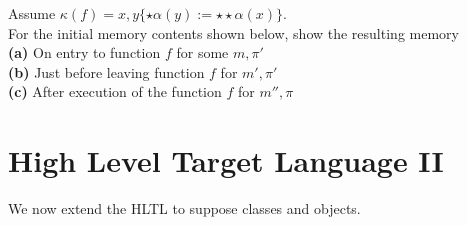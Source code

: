 \frmrule

\begin{example}
Assume $\kappa(f) = x,y \{ \star \alpha(y) := \star \star \alpha(x) \}$. \\
For the initial memory contents shown below, show the resulting memory \\
\textbf{(a)} On entry to function $f$ for some $m, \pi'$ \\
\textbf{(b)} Just before leaving function $f$ for $m', \pi'$ \\
\textbf{(c)} After execution of the function $f$ for $m'', \pi$ \\

\end{example}

\frmrule



\section{High Level Target Language II}

We now extend the HLTL to suppose classes and objects. 

